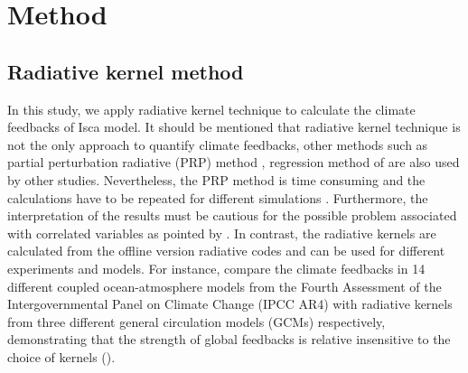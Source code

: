\section{Method} \label{sec:method_radiative_kernel}

\subsection{Radiative kernel method}
In this study, we apply radiative kernel technique \citep{Soden2008,Shell2008} to calculate the climate feedbacks of Isca model. It should be mentioned that radiative kernel technique is not the only approach to quantify climate feedbacks, other methods such as partial perturbation radiative (PRP) method \citep{Wetherald1988}, regression method of \cite{Gregory2004} are also used by other studies. Nevertheless, the PRP method is time consuming and the calculations have to be repeated for different simulations \citep{Shell2008}. Furthermore, the interpretation of the results must be cautious for the possible problem associated with correlated variables as pointed by \cite{Bony2006}.  In contrast, the radiative kernels are calculated from the offline version radiative codes and can be used for different experiments and models. For instance, \cite{Soden2008} compare the climate feedbacks in 14 different coupled ocean-atmosphere models from the Fourth Assessment of the Intergovernmental Panel on Climate Change (IPCC AR4) with radiative kernels from three different general circulation models (GCMs) respectively, demonstrating that the strength of global feedbacks is relative insensitive to the choice of kernels ().

